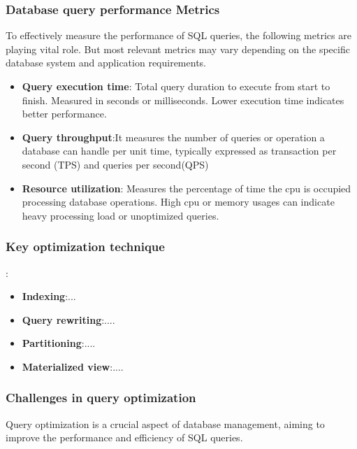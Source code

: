 \subsubsection{Database query performance Metrics}
To effectively measure the performance of SQL queries, the following metrics are playing vital role. But most relevant metrics may vary depending on the specific database system and application requirements.
\begin{itemize}
    \item\textbf{Query execution time}: Total query duration to execute from start to finish. Measured in seconds or milliseconds. Lower execution time indicates better performance.
    \item\textbf{Query throughput}:It measures the number of queries or operation a database can handle per unit time, typically expressed as transaction per second (TPS) and queries per second(QPS)
    \item\textbf{Resource utilization}: Measures the percentage of time the cpu is occupied processing database operations. High cpu or memory usages can indicate heavy processing load or unoptimized queries.
\end{itemize}
\subsubsection{Key optimization technique}:
 \begin{itemize}
     \item \textbf{Indexing}:...
     \item \textbf{Query rewriting}:....
     \item \textbf{Partitioning}:....
     \item \textbf{Materialized view}:....
 \end{itemize}
\subsubsection{Challenges in query optimization}Query optimization is a crucial aspect of database management, aiming to improve the performance and efficiency of SQL queries.\\

